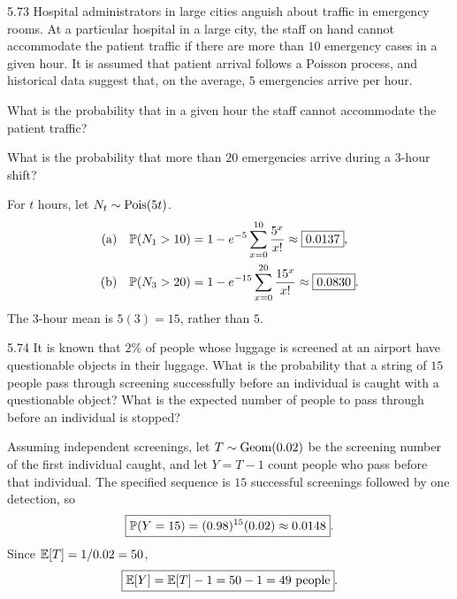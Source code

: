 \documentclass[11pt,oneside]{article}
\begin{document}
\begin{exercise}{5.73}
Hospital administrators in large cities anguish about traffic in emergency rooms. At a particular hospital in a large city, the staff on hand cannot accommodate the patient traffic if there are more than $10$ emergency cases in a given hour. It is assumed that patient arrival follows a Poisson process, and historical data suggest that, on the average, $5$ emergencies arrive per hour.
\begin{exercisesubparts}
\item What is the probability that in a given hour the staff cannot accommodate the patient traffic?
\item What is the probability that more than $20$ emergencies arrive during a $3$-hour shift?
\end{exercisesubparts}
\end{exercise}
\begin{solution}
For $t$ hours, let $N_t\sim\operatorname{Pois}(5t)$.
\begin{align*}
\textup{(a)}\quad\mathbb{P}(N_1>10)&=1-e^{-5}\sum_{x=0}^{10}\frac{5^x}{x!}\approx\boxed{0.0137},\\
\textup{(b)}\quad\mathbb{P}(N_3>20)&=1-e^{-15}\sum_{x=0}^{20}\frac{15^x}{x!}\approx\boxed{0.0830}.
\end{align*}
The $3$-hour mean is $5(3)=15$, rather than $5$.
\end{solution}

\begin{exercise}{5.74}
It is known that $2\%$ of people whose luggage is screened at an airport have questionable objects in their luggage. What is the probability that a string of $15$ people pass through screening successfully before an individual is caught with a questionable object? What is the expected number of people to pass through before an individual is stopped?
\end{exercise}
\begin{solution}
Assuming independent screenings, let $T\sim\operatorname{Geom}(0.02)$ be the screening number of the first individual caught, and let $Y=T-1$ count people who pass before that individual. The specified sequence is $15$ successful screenings followed by one detection, so
\[
\boxed{\mathbb{P}(Y=15)=(0.98)^{15}(0.02)\approx0.0148}.
\]
Since $\mathbb{E}[T]=1/0.02=50$,
\[
\boxed{\mathbb{E}[Y]=\mathbb{E}[T]-1=50-1=49\text{ people}}.
\]
\end{solution}
\end{document}
